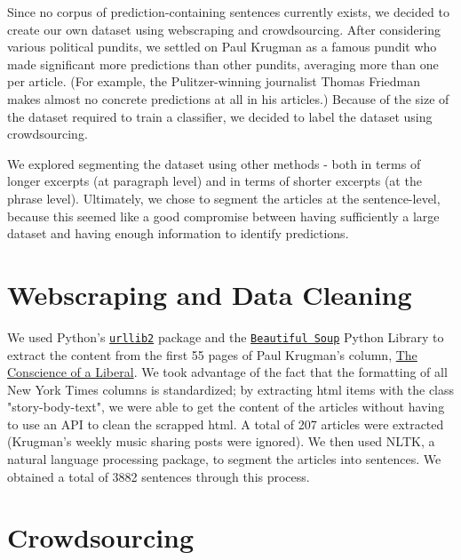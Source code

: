 \documentclass[11pt,letterpaper]{article}
\begin{document}
Since no corpus of prediction-containing sentences currently exists, we decided to create our own dataset using webscraping and crowdsourcing. After considering various political pundits, we settled on Paul Krugman as a famous pundit who made significant more predictions than other pundits, averaging more than one per article. (For example, the Pulitzer-winning journalist Thomas Friedman makes almost no concrete predictions at all in his articles.) Because of the size of the dataset required to train a classifier, we decided to label the dataset using crowdsourcing. 

We explored segmenting the dataset using other methods - both in terms of longer excerpts (at paragraph level) and in terms of shorter excerpts (at the phrase level). Ultimately, we chose to segment the articles at the sentence-level, because this seemed like a good compromise between having sufficiently a large dataset and having enough information to identify predictions.
\section{Webscraping and Data Cleaning}
\label{sec:webscraping}
We used Python's \href{https://docs.python.org/2/library/urllib2.html}{\texttt{urllib2}} package and the \href{https://www.crummy.com/software/BeautifulSoup/}{\texttt{Beautiful Soup}} Python Library to extract the content from the first 55 pages of Paul Krugman's column, \href{http://krugman.blogs.nytimes.com/}{The Conscience of a Liberal}. We took advantage of the fact that the formatting of all New York Times columns is standardized; by extracting html items with the class "story-body-text", we were able to get the content of the articles without having to use an API to clean the scrapped html. A total of 207 articles were extracted (Krugman's weekly music sharing posts were ignored). We then used NLTK, a natural language processing package, to segment the articles into sentences. We obtained a total of 3882 sentences through this process. 
\section{Crowdsourcing}
\label{sec:crowdsourcing}
\end{document}
